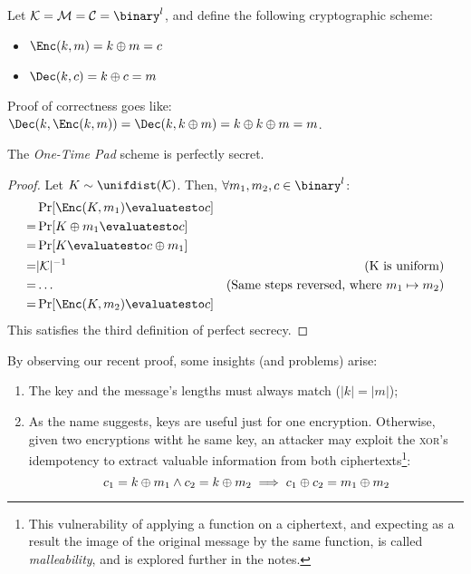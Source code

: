 Let $\K = \M = \C = \binary^l$, and define the following cryptographic scheme:
\begin{itemize}
    \item $\Enc(k, m) = k \xor m = c$
    \item $\Dec(k, c) = k \xor c = m$
\end{itemize}

Proof of correctness goes like: $\Dec(k, \Enc(k, m)) = \Dec(k, k \xor m) = k \xor k \xor m = m$.

\begin{theorem}
    The \emph{One-Time Pad} scheme is perfectly secret.
\end{theorem}
\begin{proof}
    Let $K \sim \unifdist(\K)$. Then, $\forall m_1, m_2, c \in \binary^l$:
    \begin{align*}
        & \Pr[\Enc(K, m_1) \evaluatesto c] & \\
        =& \Pr[K \xor m_1 \evaluatesto c] & \\
        =& \Pr[K \evaluatesto c \xor m_1] & \\
        =& |\K|^{-1} & \text{(K is uniform)} \\
        =& \dots & \text{(Same steps reversed, where $m_1 \mapsto m_2$)} \\
        =& \Pr[\Enc(K, m_2) \evaluatesto c] &  
    \end{align*}
    This satisfies the third definition of perfect secrecy.
\end{proof}


By observing our recent proof, some insights (and problems) arise:
\begin{enumerate}
    \item The key and the message's lengths must always match ($|k| = |m|$);
    \item As the name suggests, keys are useful just for one encryption. Otherwise, given two encryptions witht he same key, an attacker may exploit the \textsc{xor}'s idempotency to extract valuable information from both ciphertexts\footnote{This vulnerability of applying a function on a ciphertext, and expecting as a result the image of the original message by the same function, is called \emph{malleability}, and is explored further in the notes.}:
    \[
        c_1 = k \oplus m_1 \wedge c_2 = k \oplus m_2 \implies c_1 \oplus c_2 = m_1 \oplus m_2
    \]
    
\end{enumerate}

